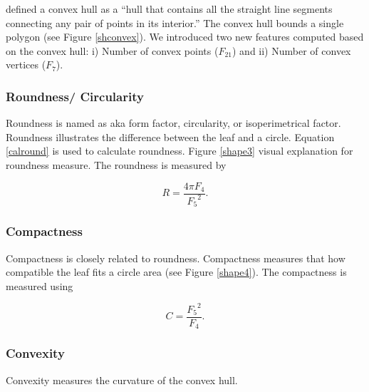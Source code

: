 \documentclass{article}
\begin{document}
\citet{inproceedings44} defined a convex hull as a
``hull that contains all the straight line segments connecting any pair
of points in its interior.'' The convex hull bounds a single polygon
(see Figure \ref{shconvex}). We introduced two new features computed
based on the convex hull: i) Number of convex points (\(F_{21}\)) and
ii) Number of convex vertices (\(F_7\)).

\hypertarget{roundness-circularity}{%
\subsubsection{Roundness/ Circularity}\label{roundness-circularity}}

Roundness is named as aka form factor, circularity, or
isoperimetrical factor. Roundness illustrates the difference between the
leaf and a circle. Equation \ref{calround} is used to calculate
roundness. Figure \ref{shape3} visual explanation for roundness measure.
The roundness is measured by

\begin{equation}
    R = \frac{4 \pi F_4}{{F_5}^2}.
\label{calround}
\end{equation}

\hypertarget{compactness}{%
\subsubsection{Compactness}\label{compactness}}

Compactness is closely related to roundness. Compactness measures
that how compatible the leaf fits a circle area (see Figure
\ref{shape4}). The compactness is measured using

\begin{equation}
    C = \frac{{F_5}^2}{F_4}.
\label{calcompact}
\end{equation}

\hypertarget{convexity}{%
\subsubsection{Convexity}\label{convexity}}

Convexity measures the curvature of the convex hull.
\end{document}
